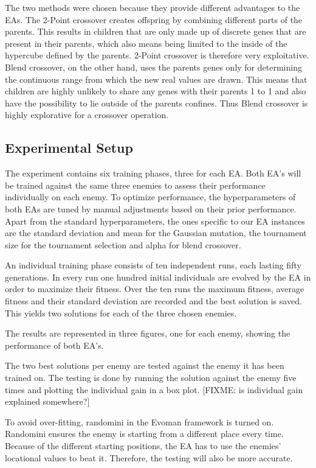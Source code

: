 The two methods were chosen because they provide different advantages to the EAs. 
The 2-Point crossover creates offspring by combining different parts of the parents. 
This results in children that are only made up of discrete genes that are present in their parents, which also means being limited to the inside of the hypercube defined by the parents. 
2-Point crossover is therefore very exploitative.
Blend crossover, on the other hand, uses the parents genes only for determining the continuous range from which the new real values are drawn. 
This means that children are highly unlikely to share any genes with their parents 1 to 1 and also have the possibility to lie outside of the parents confines. 
Thus Blend crossover is highly explorative for a crossover operation.

\subsection{Experimental Setup}
The experiment contains six training phases, three for each EA.
Both EA’s will be trained against the same three enemies to assess their performance individually on each enemy.
To optimize performance, the hyperparameters of both EAs are tuned by manual adjustments based on their prior performance.
Apart from the standard hyperparameters, the ones specific to our EA instances are the standard deviation and mean for the Gaussian mutation, the tournament size for the tournament selection and alpha for blend crossover.

An individual training phase consists of ten independent runs, each lasting fifty generations.
In every run one hundred initial individuals are evolved by the EA in order to maximize their fitness.
Over the ten runs the maximum fitness, average fitness and their standard deviation are recorded and the best solution is saved.
This yields two solutions for each of the three chosen enemies.

The results are represented in three figures, one for each enemy, showing the performance of both EA’s.

The two best solutions per enemy are tested against the enemy it has been trained on.
The testing is done by running the solution against the enemy five times and plotting the individual gain in a box plot.
[FIXME: is individual gain explained somewhere?]

To avoid over-fitting, randomini in the Evoman framework is turned on.
Randomini ensures the enemy is starting from a different place every time.
Because of the different starting positions, the EA has to use the enemies’ locational values to beat it.
Therefore, the testing will also be more accurate.

